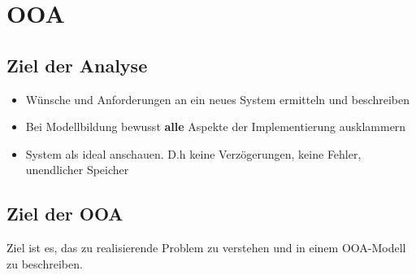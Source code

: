 
\section{OOA}

\subsection{Ziel der Analyse}
  \begin{itemize}[leftmargin = 0.5cm]
    \item Wünsche und Anforderungen an  ein neues System ermitteln und beschreiben
    \item Bei Modellbildung bewusst \textbf{alle} Aspekte der Implementierung ausklammern
    \item System als ideal anschauen. D.h keine Verzögerungen, keine Fehler, unendlicher Speicher
  \end{itemize}
  
\subsection{Ziel der OOA}
  Ziel ist es, das zu realisierende Problem zu verstehen und in einem OOA-Modell zu beschreiben.
  
